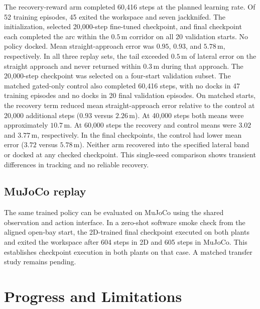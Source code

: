 \documentclass[conference]{IEEEtran}
\begin{document}
The recovery-reward arm completed 60,416 steps at the planned learning
rate. Of 52 training episodes, 45 exited the workspace and seven
jackknifed. The initialization, selected 20,000-step fine-tuned
checkpoint, and final checkpoint each completed the arc within the
$0.5\,\mathrm{m}$ corridor on all 20 validation starts. No policy
docked. Mean straight-approach error was $0.95$, $0.93$, and
$5.78\,\mathrm{m}$, respectively. In all three replay sets, the tail
exceeded $0.5\,\mathrm{m}$ of lateral error on the straight approach and
never returned within $0.3\,\mathrm{m}$ during that approach. The
20,000-step checkpoint was selected on a four-start validation subset.
The matched gated-only control also completed 60,416 steps, with no
docks in 47 training episodes and no docks in 20 final validation
episodes. On matched starts, the recovery term reduced mean
straight-approach error relative to the control at 20,000 additional
steps ($0.93$ versus $2.26\,\mathrm{m}$). At 40,000 steps both means
were approximately $10.7\,\mathrm{m}$. At 60,000 steps the recovery and
control means were $3.02$ and $3.77\,\mathrm{m}$, respectively. In the final checkpoints,
the control had lower mean error ($3.72$ versus $5.78\,\mathrm{m}$).
Neither arm recovered into the specified lateral band or docked at
any checked checkpoint. This single-seed comparison shows transient
differences in tracking and no reliable recovery.

\subsection{MuJoCo replay}

The same trained policy can be evaluated on MuJoCo using the shared
observation and action interface. In a zero-shot software smoke check from
the aligned open-bay start, the 2D-trained final checkpoint executed on
both plants and exited the workspace after 604 steps in 2D and 605 steps
in MuJoCo. This establishes checkpoint execution in both plants on that
case. A matched transfer study remains pending.

\section{Progress and Limitations}
\end{document}
